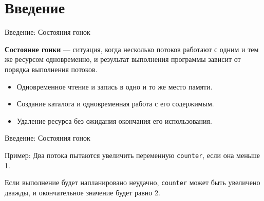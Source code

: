     \section{Введение}

    \begin{frame}[label=current]{Введение: Состояния гонок}

        \textbf{Состояние гонки} --- ситуация, когда несколько потоков работают с одним и тем же ресурсом одновременно,
        и результат выполнения программы зависит от порядка выполнения потоков.

        \begin{itemize}
            \item Одновременное чтение и запись в одно и то же место памяти.
            \item Создание каталога и одновременная работа с его содержимым.
            \item Удаление ресурса без ожидания окончания его использования.
        \end{itemize}


    \end{frame}

    \begin{frame}[label=current]{Введение: Состояния гонок}

        Пример: Два потока пытаются увеличить переменную \texttt{counter}, если она меньше 1.

        

        Если выполнение будет напланировано неудачно, \texttt{counter} может быть увеличено дважды, и
        окончательное значение будет равно 2.


    \end{frame}

